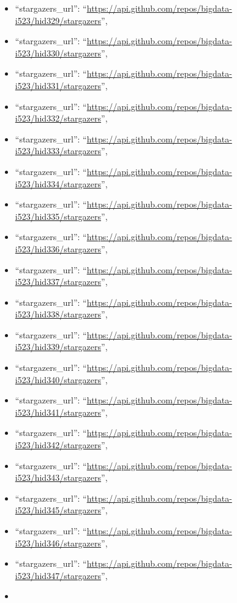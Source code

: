 \begin{itemize}
\item
  ``stargazers\_url'':
  ``\url{https://api.github.com/repos/bigdata-i523/hid329/stargazers}'',
\item
  ``stargazers\_url'':
  ``\url{https://api.github.com/repos/bigdata-i523/hid330/stargazers}'',
\item
  ``stargazers\_url'':
  ``\url{https://api.github.com/repos/bigdata-i523/hid331/stargazers}'',
\item
  ``stargazers\_url'':
  ``\url{https://api.github.com/repos/bigdata-i523/hid332/stargazers}'',
\item
  ``stargazers\_url'':
  ``\url{https://api.github.com/repos/bigdata-i523/hid333/stargazers}'',
\item
  ``stargazers\_url'':
  ``\url{https://api.github.com/repos/bigdata-i523/hid334/stargazers}'',
\item
  ``stargazers\_url'':
  ``\url{https://api.github.com/repos/bigdata-i523/hid335/stargazers}'',
\item
  ``stargazers\_url'':
  ``\url{https://api.github.com/repos/bigdata-i523/hid336/stargazers}'',
\item
  ``stargazers\_url'':
  ``\url{https://api.github.com/repos/bigdata-i523/hid337/stargazers}'',
\item
  ``stargazers\_url'':
  ``\url{https://api.github.com/repos/bigdata-i523/hid338/stargazers}'',
\item
  ``stargazers\_url'':
  ``\url{https://api.github.com/repos/bigdata-i523/hid339/stargazers}'',
\item
  ``stargazers\_url'':
  ``\url{https://api.github.com/repos/bigdata-i523/hid340/stargazers}'',
\item
  ``stargazers\_url'':
  ``\url{https://api.github.com/repos/bigdata-i523/hid341/stargazers}'',
\item
  ``stargazers\_url'':
  ``\url{https://api.github.com/repos/bigdata-i523/hid342/stargazers}'',
\item
  ``stargazers\_url'':
  ``\url{https://api.github.com/repos/bigdata-i523/hid343/stargazers}'',
\item
  ``stargazers\_url'':
  ``\url{https://api.github.com/repos/bigdata-i523/hid345/stargazers}'',
\item
  ``stargazers\_url'':
  ``\url{https://api.github.com/repos/bigdata-i523/hid346/stargazers}'',
\item
  ``stargazers\_url'':
  ``\url{https://api.github.com/repos/bigdata-i523/hid347/stargazers}'',
\item

\end{itemize}
